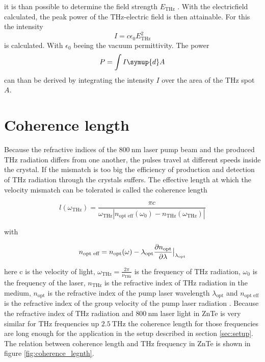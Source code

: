 it is than possible to determine the field strength $E_\text{THz}$ \cite[7]{THZ_eltric_field}.
With the electricfield calculated, the peak power of the $\si{\tera\hertz}$-electric field is then attainable.
For this the intensity
\begin{equation}
    I = c \epsilon_0 E_\text{THz}^2
    \label{eq:intensity}
\end{equation}
is calculated. With $\epsilon_0$ beeing the vacuum permittivity.
The power 
\begin{equation}
    P = \int I \symup{d}A
    \label{eq:power}
\end{equation}
can than be derived by integrating the intensity $I$ over the area of the $\si{\tera\hertz}$ spot $A$.


\section{Coherence length}
Because the refractive indices of the $\SI{800}{\nano\meter}$ laser pump beam and the produced $\si{\tera\hertz}$ radiation differs from one another, the pulses travel at different speeds inside the crystal.
If the mismatch is too big the efficiency of production and detection of $\si{\tera\hertz}$ radiation through the crystals suffers.
The effective length at which the velocity mismatch can be tolerated is called the coherence length

\begin{equation}
    l(\omega_{\si{\tera\hertz}}) = \frac{\pi c}{\omega_{\si{\tera\hertz}} \left | n_\text{opt eff}(\omega_0) - n_{\si{\tera\hertz}}(\omega_{\si{\tera\hertz}})\right |}
\end{equation}

with 

\begin{equation}
    n_{\text{opt eff}} = n_\text{opt}(\omega) - \lambda_\text{opt}\frac{\partial n_\text{opt}}{\partial \lambda}\big{|}_{\lambda_\text{opt}}   
\end{equation}

here c is the velocity of light, $\omega_{\si{\tera\hertz}} = \frac{2\pi}{\nu_{\si{\tera\hertz}}}$ is the frequency of $\si{\tera\hertz}$ radiation, $\omega_0$ is the frequency of the laser, $n_{\si{\tera\hertz}}$ is the refractive index of $\si{\tera\hertz}$ radiation in the medium, $n_\text{opt}$ is the refractive index of the pump laser wavelength $\lambda_\text{opt}$ and $n_\text{opt eff}$ is the refractive index of the group velocity of the pump laser radiation \cite[3]{coherence_legnth}.
Because the refractive index of $\si{\tera\hertz}$ radiation and $\SI{800}{\nano\meter}$ laser light in ZnTe is very similar for $\si{\tera\hertz}$ frequencies up $\SI{2.5}{\tera\hertz}$ \cite{coherence_legnth} the coherence length for those frequencies are long enough for the application in the setup described in section \ref{sec:setup}.
The relation between coherence length and $\si{\tera\hertz}$ frequency in ZnTe is shown in figure \ref{fig:coherence_legnth}.

